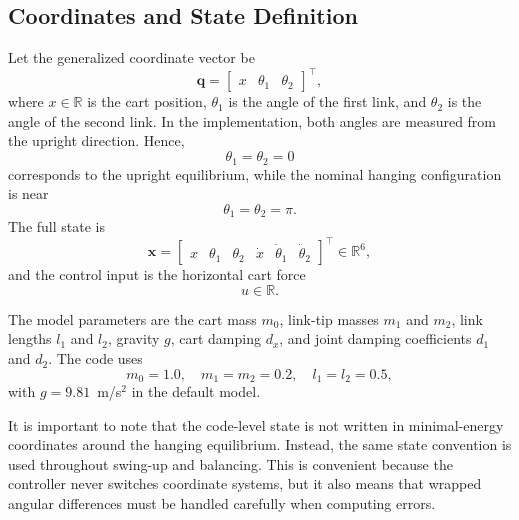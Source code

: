 \documentclass[conference]{IEEEtran}
\begin{document}
\subsection{Coordinates and State Definition}
Let the generalized coordinate vector be
\begin{equation}
\bm{q} = \begin{bmatrix} x & \theta_1 & \theta_2 \end{bmatrix}^\top,
\end{equation}
where $x \in \mathbb{R}$ is the cart position, $\theta_1$ is the angle of the first link, and $\theta_2$ is the angle of the second link. In the implementation, both angles are measured from the upright direction. Hence,
\begin{equation}
\theta_1 = \theta_2 = 0
\end{equation}
corresponds to the upright equilibrium, while the nominal hanging configuration is near
\begin{equation}
\theta_1 = \theta_2 = \pi.
\end{equation}
The full state is
\begin{equation}
\bm{x} = \begin{bmatrix} x & \theta_1 & \theta_2 & \dot{x} & \dot{\theta}_1 & \dot{\theta}_2 \end{bmatrix}^\top \in \mathbb{R}^6,
\end{equation}
and the control input is the horizontal cart force
\begin{equation}
u \in \mathbb{R}.
\end{equation}

The model parameters are the cart mass $m_0$, link-tip masses $m_1$ and $m_2$, link lengths $l_1$ and $l_2$, gravity $g$, cart damping $d_x$, and joint damping coefficients $d_1$ and $d_2$. The code uses
\begin{equation}
m_0 = 1.0, \quad m_1 = m_2 = 0.2, \quad l_1 = l_2 = 0.5,
\end{equation}
with $g=9.81$~m/s$^2$ in the default model.

It is important to note that the code-level state is not written in minimal-energy coordinates around the hanging equilibrium. Instead, the same state convention is used throughout swing-up and balancing. This is convenient because the controller never switches coordinate systems, but it also means that wrapped angular differences must be handled carefully when computing errors.
\end{document}
